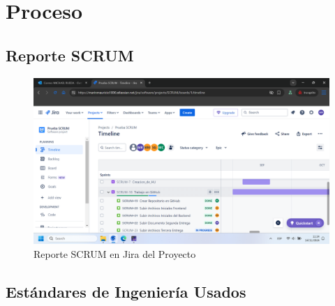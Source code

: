 \documentclass[stu, 12pt, letterpaper, donotrepeattitle, floatsintext, natbib]{apa7}
\begin{document}
\section{Proceso}

\subsection{Reporte SCRUM}

\begin{figure}[H]
	\caption[]{Reporte SCRUM en Jira del Proyecto}
	\label{Reporte SCRUM en Jira del Proyecto}
	\includegraphics[width=1\linewidth]{Diagramas/Reporte SCRUM.png}
\end{figure}

\subsection{Estándares de Ingeniería Usados}
\end{document}
